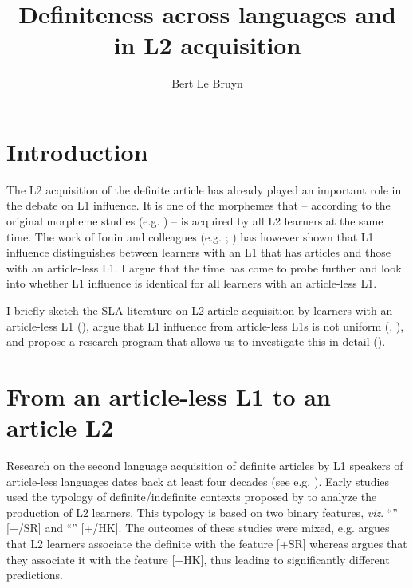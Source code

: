 \documentclass[output=paper,
modfonts
]{langscibook}
\title{Definiteness across languages and in L2 acquisition}
\author{%
Bert Le Bruyn\affiliation{Utrecht Institute of Linguistics OTS}
}
\begin{document}
\maketitle

\section{Introduction}
The L2 acquisition of the definite article has already played an important role in the debate on L1 influence. It is one of the morphemes that -- according to the original morpheme studies (e.g. \citealt{DulayBurt1974}) -- is acquired by all L2 learners at the same time. The work of Ionin and colleagues (e.g. \citealt{IoninKoWexler2004}; \citealt{IoninMontrul2010}) has however shown that L1 influence distinguishes between learners with an L1 that has articles and those with an article-less L1. I argue that the time has come to probe further and look into whether L1 influence is identical for all learners with an article-less L1. 

I briefly sketch the SLA literature on L2 article acquisition by learners with an article-less L1 (), argue that L1 influence from article-less L1s is not uniform \largerpage (, ), and propose a research program that allows us to investigate this in detail ().

\section{From an article-less L1 to an article L2}\label{sec:lebruyn:2}

Research on the second language acquisition of definite articles by L1 speakers of article-less languages dates back at least four decades (see e.g. \citealt{Hakuta1976}). Early studies \citep{Huebner1983,TaroneParrish1988,Thomas1989} used the typology of definite/indefinite contexts proposed by \citet{Bickerton1981} to analyze the production of L2 learners. This typology is based on two binary features, \textit{viz}. ``'' [+\slash\textminus SR] and ``'' [+\slash\textminus HK]. The outcomes of these studies were mixed, e.g. \citet{Thomas1989} argues that L2 learners associate the definite with the feature [+SR] whereas \citet{Master1987} argues that they associate it with the feature [+HK], thus leading to significantly different predictions.
\end{document}
